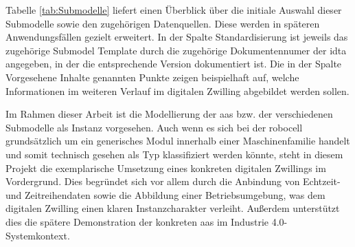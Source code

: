 Tabelle \ref{tab:Submodelle} liefert einen Überblick über die initiale Auswahl dieser Submodelle sowie den zugehörigen Datenquellen.
Diese werden in späteren Anwendungsfällen gezielt erweitert.
In der Spalte Standardisierung ist jeweils das zugehörige Submodel Template durch die zugehörige Dokumentennumer der \acs{idta} angegeben, in der die entsprechende Version dokumentiert ist.
Die in der Spalte Vorgesehene Inhalte genannten Punkte zeigen beispielhaft auf, welche Informationen im weiteren Verlauf im digitalen Zwilling abgebildet werden sollen.



Im Rahmen dieser Arbeit ist die Modellierung der \acs{aas} bzw. der verschiedenen Submodelle als Instanz vorgesehen.
Auch wenn es sich bei der robocell grundsätzlich um ein generisches Modul innerhalb einer Maschinenfamilie handelt und somit technisch gesehen als Typ klassifiziert werden könnte, steht in diesem Projekt die exemplarische Umsetzung eines konkreten digitalen Zwillings im Vordergrund.
Dies begründet sich vor allem durch die Anbindung von Echtzeit- und Zeitreihendaten sowie die Abbildung einer Betriebsumgebung, was dem digitalen Zwilling einen klaren Instanzcharakter verleiht.
Außerdem unterstützt dies die spätere Demonstration der konkreten \acs{aas} im Industrie 4.0-Systemkontext.




